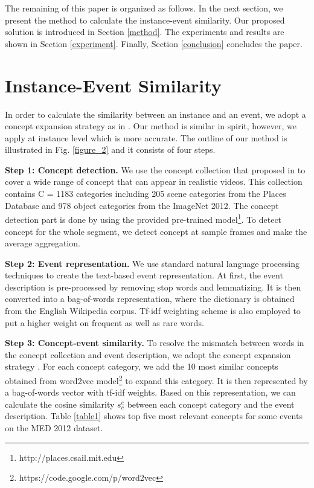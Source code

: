 The remaining of this paper is organized as follows. In the next section, we present the method to calculate the instance-event similarity. Our proposed solution is introduced in Section \ref{method}. The experiments and results are shown in Section \ref{experiment}. Finally, Section \ref{conclusion} concludes the paper.

\section{Instance-Event Similarity}
In order to calculate the similarity between an instance and an event, we adopt a concept expansion strategy as in \cite{chen2014event}. Our method is similar in spirit, however, we apply at instance level which is more accurate. The outline of our method is illustrated in Fig. \ref{figure_2} and it consists of four steps.

\textbf{Step 1: Concept detection.} We use the concept collection that proposed in \cite{zhou2014places} to cover a wide range of concept that can appear in realistic videos. This collection contains C = 1183 categories including 205 scene categories from the Places Database and 978 object categories from the ImageNet 2012. The concept detection part is done by using the provided pre-trained model\footnote{http://places.csail.mit.edu}. To detect concept for the whole segment, we detect concept at sample frames and make the average aggregation.

\textbf{Step 2: Event representation.} We use standard natural language processing techniques to create the text-based event representation. At first, the event description is pre-processed by removing stop words and lemmatizing. It is then converted into a bag-of-words representation, where the dictionary is obtained from the English Wikipedia corpus. Tf-idf weighting scheme is also employed to put a higher weight on frequent as well as rare words.

\textbf{Step 3: Concept-event similarity.} To resolve the mismatch between words in the concept collection and event description, we adopt the concept expansion strategy \cite{chen2014event}. For each concept category, we add the 10 most similar concepts obtained from word2vec model\footnote{https://code.google.com/p/word2vec} to expand this category. It is then represented by a bag-of-words vector with tf-idf weights. Based on this representation, we can calculate the cosine similarity $s_{c}^{e}$ between each concept category and the event description. Table \ref{table1} shows top five most relevant concepts for some events on the MED 2012 dataset. 

